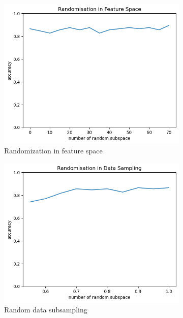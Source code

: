 \begin{figure}[htbp]
	\centering
	\begin{subfigure}[t]{0.3\linewidth}
		\centering
		\includegraphics[width=\linewidth]{image/q3_fs_rs.png}
		\caption{Randomization in feature space}
		\label{fig:q3_fs}
	\end{subfigure}%
	\hfill
	\begin{subfigure}[t]{0.3\linewidth}
		\centering
		\includegraphics[width=\linewidth]{image/q3_data_rs.png}
		\caption{Random data subsampling}
		\label{fig:q3_data}
	\end{subfigure}
	\hfill
	\begin{subfigure}[t]{0.3\linewidth}

\end{subfigure}
\end{figure}
